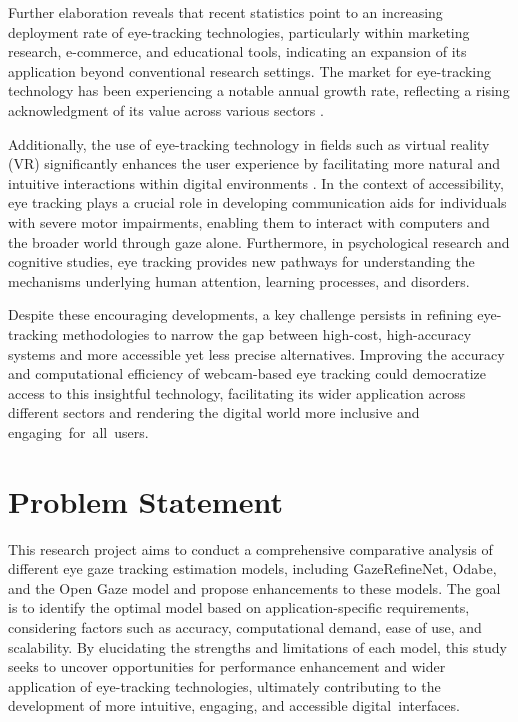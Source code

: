 \documentclass[conference]{IEEEtran}
\begin{document}
Further elaboration reveals that recent statistics point to an increasing deployment rate of eye-tracking technologies, particularly within marketing research, e-commerce, and educational tools, indicating an expansion of its application beyond conventional research settings. The market for eye-tracking technology has been experiencing a notable annual growth rate, reflecting a rising acknowledgment of its value across various sectors \cite{market-growth}.

Additionally, the use of eye-tracking technology in fields such as virtual reality (VR) significantly enhances the user experience by facilitating more natural and intuitive interactions within digital environments \cite{VR-eyetracking}. In the context of accessibility, eye tracking plays a crucial role in developing communication aids for individuals with severe motor impairments, enabling them to interact with computers and the broader world through gaze alone. Furthermore, in psychological research and cognitive studies, eye tracking provides new pathways for understanding the mechanisms underlying human attention, learning processes, and disorders.

Despite these encouraging developments, a key challenge persists in refining eye-tracking methodologies to narrow the gap between high-cost, high-accuracy systems and more accessible yet less precise alternatives. Improving the accuracy and computational efficiency of webcam-based eye tracking could democratize access to this insightful technology, facilitating its wider application across different sectors and rendering the digital world more inclusive and engaging for all users.

\section{Problem Statement}

This research project aims to conduct a comprehensive comparative analysis of different eye gaze tracking estimation models, including GazeRefineNet, Odabe, and the Open Gaze model and propose enhancements to these models. The goal is to identify the optimal model based on application-specific requirements, considering factors such as accuracy, computational demand, ease of use, and scalability. By elucidating the strengths and limitations of each model, this study seeks to uncover opportunities for performance enhancement and wider application of eye-tracking technologies, ultimately contributing to the development of more intuitive, engaging, and accessible digital interfaces.
\end{document}
